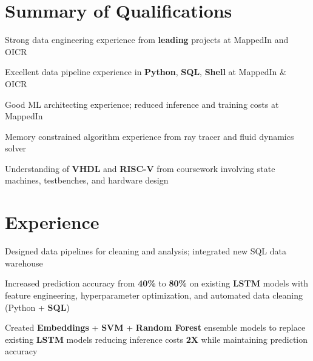 \documentclass[]{chandan-cv}
\begin{document}
\hfill
\begin{minipage}[t]{0.75\textwidth}


\section{Summary of Qualifications}
\runsubsection{ }
\descript{ }
\location{ }
\vspace{\topsep} %
\begin{tightemize}
	\item Strong data engineering experience from \textbf{leading} projects at MappedIn and OICR
	\item Excellent data pipeline experience in \textbf{Python}, \textbf{SQL}, \textbf{Shell} at MappedIn \& OICR
	\item Good ML architecting experience; reduced inference and training costs at MappedIn
	\item Memory constrained algorithm experience from ray tracer and fluid dynamics solver
	\item Understanding of \textbf{VHDL} and \textbf{RISC-V} from coursework involving 
	state machines, testbenches, and hardware design
\end{tightemize}
\sectionsep


\section{Experience}

\begin{tightemize}
        \item Designed data pipelines for cleaning and analysis; integrated new SQL data warehouse
		\item Increased prediction accuracy from \textbf{40\%} to \textbf{80\%} on existing \textbf{LSTM} 
		models with feature engineering, hyperparameter optimization, and automated data cleaning (Python + \textbf{SQL})
		\item Created \textbf{Embeddings} + \textbf{SVM} + \textbf{Random Forest} ensemble models to replace existing 
		\textbf{LSTM} models reducing inference costs \textbf{2X} while maintaining prediction accuracy
\end{tightemize}
\sectionsep


\end{minipage}
\end{document}
